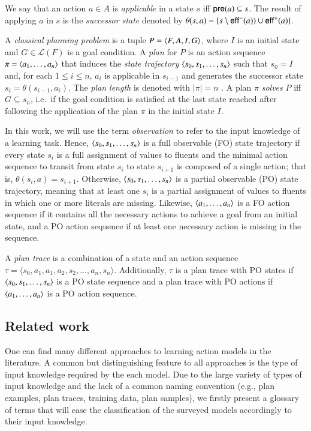 We say that an action $a\in A$ is {\em applicable} in a state $s$ iff $\mathsf{pre}(a)\subseteq s$. The result of applying $a$ in $s$ is the {\em successor state} denoted by $\theta(s,a)=\{s\setminus\mathsf{eff}^-(a))\cup\mathsf{eff}^+(a)\}$.

A {\em classical planning problem} is a tuple $P={\langle F,A,I,G \rangle}$, where $I$ is an initial state and $G\in\mathcal{L}(F)$ is a goal condition. A {\em plan} for $P$ is an action sequence $\pi={\langle a_1, \ldots, a_n \rangle}$ that induces the {\em state trajectory} ${\langle s_0, s_1, \ldots, s_n \rangle}$ such that $s_0=I$ and, for each {\small $1\leq i\leq n$}, $a_i$ is applicable in $s_{i-1}$ and generates the successor state $s_i=\theta(s_{i-1},a_i)$. The {\em plan length} is denoted with $|\pi|=n$ . A plan $\pi$ {\em solves} $P$ iff $G\subseteq s_n$, i.e.~if the goal condition is satisfied at the last state reached after following the application of the plan $\pi$ in the initial state $I$.

In this work, we will use the term \emph{observation} to refer to the input knowledge of a learning task. Hence, ${\langle s_0, s_1, \ldots, s_n \rangle}$ is a full observable (FO) state trajectory if every state $s_i$ is a full assignment of values to fluents and the minimal action sequence to transit from state $s_i$ to state $s_{i+1}$ is composed of a single action; that is, $\theta(s_i,a)=s_{i+1}$. Otherwise, ${\langle s_0, s_1, \ldots, s_n \rangle}$ is a partial observable (PO) state trajectory, meaning that at least one $s_i$ is a partial assignment of values to fluents in which one or more literals are missing. Likewise, ${\langle a_1, \ldots, a_n \rangle}$ is a FO action sequence if it contains all the necessary actions to achieve a goal from an initial state, and a PO action sequence if at least one necessary action is missing in the sequence.

A \emph{plan trace} is a combination of a state and an action sequence $\tau = \langle s_0, a_1, a_1, a_2, s_2, \ldots, a_n, s_n \rangle$. Additionally, $\tau$ is a plan trace with PO states if ${\langle s_0, s_1, \ldots, s_n \rangle}$ is a PO state sequence and a plan trace with PO actions if ${\langle a_1, \ldots, a_n \rangle}$ is a PO action sequence.



\subsection{Related work}
\label{related_work}



One can find many different approaches to learning action models in the literature. A common but distinguishing feature to all approaches is the type of input knowledge required by the each model. Due to the large variety of types of input knowledge and the lack of a common naming convention (e.g., plan examples, plan traces, training data, plan samples), we firstly present a glossary of terms that will ease the classification of the surveyed models accordingly to their input knowledge.




